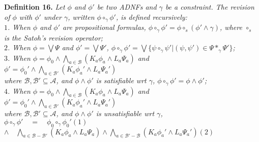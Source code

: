 \documentclass{llncs}
\begin{document}
\textbf{Definition 16.} \textit{Let $\phi$ and $\phi'$ be two ADNFs and $\gamma$ be a constraint. The revision of $\phi$ with $\phi'$ under $\gamma$, written $\phi\circ_\gamma\phi'$, is defined recursively:\\
\hspace*{0.1in} $1$. When $\phi$ and $\phi'$ are propositional formulas, $\phi\circ_\gamma\phi'=\phi\circ_s(\phi'\land\gamma)$, where $\circ_s$ \\
\hspace*{0.1in}\hspace{0.15in} is the Satoh's revision operator\cite{satoh1988nonmonotonic};\\
\hspace*{0.1in} $2$. When $\phi=\bigvee\Psi$ and $\phi'=\bigvee\Psi'$, $\phi\circ_\gamma\phi'=\bigvee\{\psi\circ_\gamma\psi'|(\psi, \psi')\in\Psi*_\gamma\Psi'\}$;\\
\hspace*{0.1in} $3$. When $\phi=\phi_0\land\bigwedge_{a\in\mathcal{B}}(K_a\phi_a\land L_a\Psi_a)$ and $\phi'=\phi_0'\land\bigwedge_{a\in\mathcal{B}'}(K_a\phi_a'\land L_a\Psi_a')$ \\
\hspace*{0.1in}\hspace{0.15in} where $\mathcal{B}, \mathcal{B'}\subseteq\mathcal{A}$, and $\phi\land\phi'$ is satisfiable wrt $\gamma$, $\phi\circ_\gamma\phi'=\phi\land\phi'$;\\
\hspace*{0.1in} $4$. When $\phi=\phi_0\land\bigwedge_{a\in\mathcal{B}}(K_a\phi_a\land L_a\Psi_a)$ and $\phi'=\phi_0'\land\bigwedge_{a\in\mathcal{B}'}(K_a\phi_a'\land L_a\Psi_a')$ \\
\hspace*{0.1in}\hspace{0.15in} where $\mathcal{B}, \mathcal{B'}\subseteq\mathcal{A}$, and $\phi\land\phi'$ is unsatisfiable wrt $\gamma$, \\
\hspace*{0.1in}\hspace{0.2in} $\phi\circ_\gamma\phi'\quad=\quad\phi_0\circ_\gamma\phi_0'$\hspace{3in}$(1)$\\
\hspace*{0.1in}\hspace{0.75in} $\land\quad\bigwedge_{a\in\mathcal{B}-\mathcal{B}'}(K_a\phi_a\land L_a\Psi_a)\land\bigwedge_{a\in\mathcal{B}'-\mathcal{B}}(K_a\phi_a'\land L_a\Psi_a')$\hspace{0.5in}$(2)$\\
}
\end{document}
